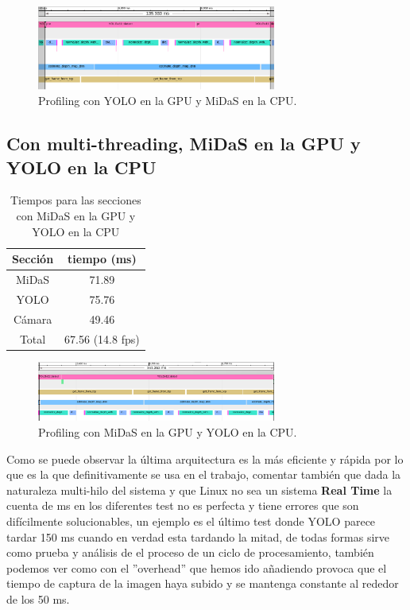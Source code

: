 \begin{figure}[H]
    \centering
    \includegraphics[width=0.7\textwidth]{images/ygpu_mcpu_prof.png}
    \caption{Profiling con YOLO en la GPU y MiDaS en la CPU.}
    \label{fig:yologpu_midas_cpu_prof}
\end{figure}



        \subsection{Con multi-threading, MiDaS en la GPU y YOLO en la CPU}
\begin{table}[H]
    \centering
    \begin{tabular}{|c|c|}
        \hline
        \textbf{Sección} & \textbf{tiempo (ms)}  \\
        \hline
        MiDaS   & 71.89     \\
        YOLO    & 75.76    \\
        Cámara  & 49.46   \\
        Total   & 67.56 (14.8 fps)    \\

        \hline
    \end{tabular}
    \caption{Tiempos para las secciones con MiDaS en la GPU y YOLO en la CPU}
    \label{tab:yolocpu_midas_gpu}
\end{table}


\begin{figure}[H]
    \centering
    \includegraphics[width=0.7\textwidth]{images/mgpu_ycpu_prof.png}
    \caption{Profiling con MiDaS en la GPU y YOLO en la CPU.}
    \label{fig:yolocpu_midas_gpu_prof}
\end{figure}

Como se puede observar la última arquitectura es la más eficiente y rápida por lo que es la que definitivamente se usa en el trabajo, comentar también que dada la naturaleza multi-hilo del sistema y que Linux no sea un sistema \textbf{Real Time} la cuenta de ms en los diferentes test no es perfecta y tiene errores que son difícilmente solucionables, un ejemplo es el último test donde YOLO parece tardar 150 ms cuando en verdad esta tardando la mitad, de todas formas sirve como prueba y análisis de el proceso de un ciclo de procesamiento, también podemos ver como con el ''overhead'' que hemos ido añadiendo provoca que el tiempo de captura de la imagen haya subido y se mantenga  constante al rededor de los 50 ms.

